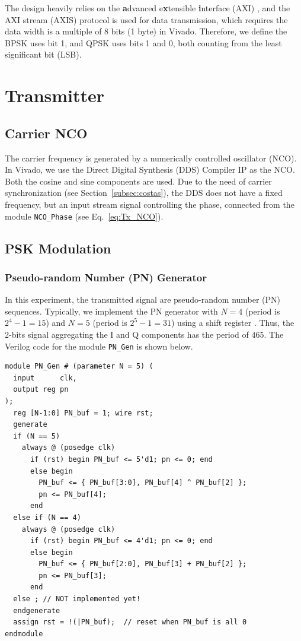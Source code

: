 \documentclass[journal,twoside]{IEEEtran}
\begin{document}
      The design heavily relies on the \textbf{a}dvanced e\textbf{x}tensible \textbf{i}nterface (AXI) \cite{xilinx:ug1037},
      and the AXI stream (AXIS) protocol is used for data transmission,
      which requires the data width is a multiple of 8 bits (1 byte) in Vivado.
      Therefore, we define the BPSK uses bit 1, and QPSK uses bits 1 and 0,
      both counting from the least significant bit (LSB).

    \section{Transmitter}

    \subsection{Carrier NCO}

      The carrier frequency is generated by a numerically controlled oscillator (NCO).
      In Vivado, we use the Direct Digital Synthesis (DDS) Compiler IP \cite{xilinx:pg141} as the NCO.
      Both the cosine and sine components are used.
      Due to the need of carrier synchronization (see Section~\ref{subsec:costas}),
      the DDS does not have a fixed frequency,
      but an input stream signal controlling the phase,
      connected from the module \texttt{NCO\_Phase} (see Eq.~\eqref{eq:Tx_NCO}).

  \subsection{PSK Modulation}

    \subsubsection{Pseudo-random Number (PN) Generator}

      In this experiment, the transmitted signal are pseudo-random number (PN) sequences.
      Typically, we implement the PN generator with $N=4$ (period is $2^4-1=15$) and $N=5$ (period is $2^5-1=31$)
      using a shift register \cite{james1990review}.
      Thus, the 2-bits signal aggregating the I and Q components has the period of $465$.
      The Verilog code for the module \texttt{PN\_Gen} is shown below.
      \begin{verbatim}
module PN_Gen # (parameter N = 5) (
  input      clk,
  output reg pn
);
  reg [N-1:0] PN_buf = 1; wire rst;
  generate
  if (N == 5)
    always @ (posedge clk)
      if (rst) begin PN_buf <= 5'd1; pn <= 0; end
      else begin
        PN_buf <= { PN_buf[3:0], PN_buf[4] ^ PN_buf[2] };
        pn <= PN_buf[4];
      end
  else if (N == 4)
    always @ (posedge clk)
      if (rst) begin PN_buf <= 4'd1; pn <= 0; end
      else begin
        PN_buf <= { PN_buf[2:0], PN_buf[3] + PN_buf[2] };
        pn <= PN_buf[3];
      end
  else ; // NOT implemented yet!
  endgenerate
  assign rst = !(|PN_buf);  // reset when PN_buf is all 0
endmodule
      \end{verbatim}
\end{document}
